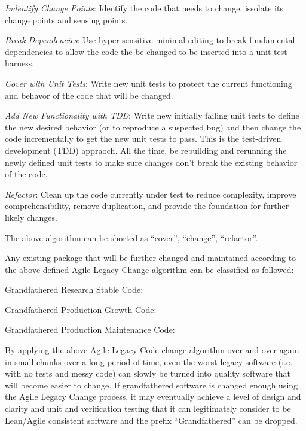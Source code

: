 \documentclass[11pt]{SANDreport}
\begin{document}
\begin{compactenum}

{}\item\textit{Indentify Change Points}: Identify the code that needs
to change, issolate its change points and sensing points.

{}\item\textit{Break Dependencies}: Use hyper-sensitive minimal
editing to break fundamental dependencies to allow the code the be
changed to be inserted into a unit test harness.

{}\item\textit{Cover with Unit Tests}: Write new unit tests to protect
the current functioning and behavor of the code that will be changed.

{}\item\textit{Add New Functionality with TDD}: Write new initially
failing unit tests to define the new desired behavior (or to reproduce
a suspected bug) and then change the code incrementally to get the new
unit tests to pass.  This is the test-driven development (TDD)
appraoch.  All the time, be rebuilding and rerunning the newly defined
unit tests to make sure changes don't break the existing behavior of
the code.

{}\item\textit{Refactor}: Clean up the code currently under test to
reduce complexity, improve comprehensibility, remove duplication, and
provide the foundation for further likely changes.

\end{compactenum}

The above algorithm can be shorted as ``cover'', ``change'',
``refactor''.

Any existing package that will be further changed and maintained
according to the above-defined Agile Legacy Change algorithm can be
classified as followed:

\begin{compactenum}

{}\item Grandfathered Research Stable Code:

{}\item Grandfathered Production Growth Code:

{}\item Grandfathered Production Maintenance Code:

\end{compactenum}

By applying the above Agile Legacy Code change algorithm over and over
again in small chunks over a long period of time, even the worst
legacy software (i.e. with no tests and messy code) can slowly be
turned into quality software that will become easier to change.  If
grandfathered software is changed enough using the Agile Legacy Change
process, it may eventually achieve a level of design and clarity and
unit and verification testing that it can legitimately consider to be
Lean/Agile consistent software and the prefix ``Grandfathered'' can be
dropped.
\end{document}
